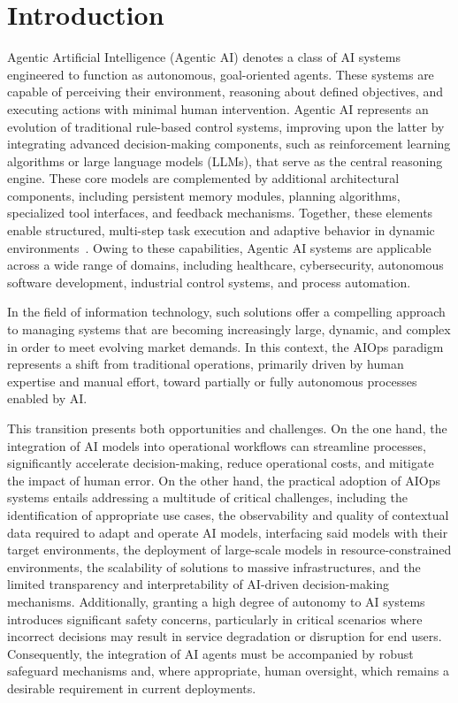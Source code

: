 \chapter{Introduction}
\label{sec:introduction}

Agentic Artificial Intelligence (Agentic AI) denotes a class of AI systems engineered
to function as autonomous, goal-oriented agents. These systems are capable of perceiving
their environment, reasoning about defined objectives, and executing actions with minimal
human intervention. Agentic AI represents an evolution of traditional rule-based control
systems, improving upon the latter by integrating advanced decision-making components,
such as reinforcement learning algorithms or large language models (LLMs), that
serve as the central reasoning engine. These core models are complemented by additional
architectural components, including persistent memory modules, planning algorithms,
specialized tool interfaces, and feedback mechanisms. Together, these elements enable
structured, multi-step task execution and adaptive behavior in dynamic
environments~\cite{agentic2025acharya}.
Owing to these capabilities, Agentic AI systems are applicable across a wide range of
domains, including healthcare, cybersecurity, autonomous software development, industrial
control systems, and process automation.

In the field of information technology, such solutions offer a compelling approach to
managing systems that are becoming increasingly large, dynamic, and complex in order to
meet evolving market demands. In this context, the \gls{AIOps} paradigm~\cite{GartnerAIOpsDefinition}
represents a shift from traditional operations, primarily driven by human expertise
and manual effort, toward partially or fully autonomous processes enabled by AI.

This transition presents both opportunities and challenges. On the one hand, the
integration of AI models into operational workflows can streamline processes,
significantly accelerate decision-making, reduce operational costs, and mitigate the
impact of human error. On the other hand, the practical adoption of AIOps systems
entails addressing a multitude of critical challenges, including the identification
of appropriate use cases, the observability and quality of contextual data required
to adapt and operate AI models, interfacing said models with their target environments,
the deployment of large-scale models in resource-constrained environments, the
scalability of solutions to massive infrastructures, and the limited transparency
and interpretability of AI-driven decision-making mechanisms.
Additionally, granting a high degree of autonomy to AI systems introduces significant
safety concerns, particularly in critical scenarios where incorrect decisions may
result in service degradation or disruption for end users. Consequently, the integration
of AI agents must be accompanied by robust safeguard mechanisms and, where appropriate,
human oversight, which remains a desirable requirement in current deployments.

